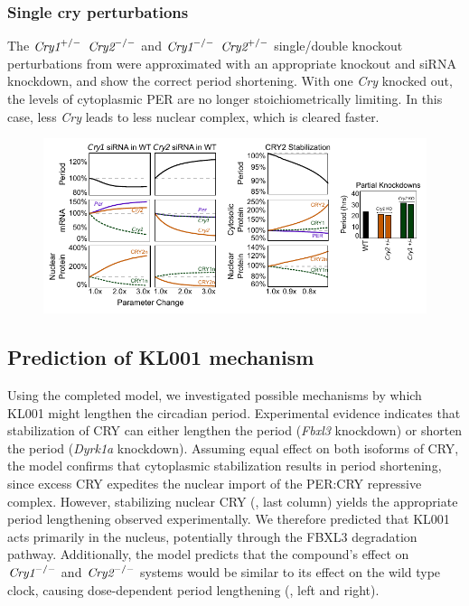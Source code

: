 \subsubsection{Single cry perturbations}
The $\text{\it Cry1}^{+/-}$ $\text{\it Cry2}^{-/-}$ and $\text{\it Cry1}^{-/-}$ $\text{\it Cry2}^{+/-}$ single/double knockout perturbations from \cite{VanderHorst1999} were approximated with an appropriate knockout and siRNA knockdown, and show the correct period shortening. 
With one {\it Cry} knocked out, the levels of cytoplasmic PER are no longer stoichiometrically limiting. 
In this case, less {\it Cry} leads to less nuclear complex, which is cleared faster.

\begin{figure}[bt]
  \centering
  \includegraphics[width=\textwidth]{chap2/figures/experimentalvalidation.pdf}
   \label{fig:experimentalvalidation}
\end{figure}

\subsection{Prediction of KL001 mechanism}
Using the completed model, we investigated possible mechanisms by which KL001 might lengthen the circadian period. 
Experimental evidence indicates that stabilization of CRY can either lengthen the period ({\it Fbxl3} knockdown) or shorten the period ({\it Dyrk1a} knockdown). 
Assuming equal effect on both isoforms of CRY, the model confirms that cytoplasmic stabilization results in period shortening, since excess CRY expedites the nuclear import of the PER:CRY repressive complex. 
However, stabilizing nuclear CRY (, last column) yields the appropriate period lengthening observed experimentally. 
We therefore predicted that KL001 acts primarily in the nucleus, potentially through the FBXL3 degradation pathway. 
Additionally, the model predicts that the compound’s effect on $\text{\it Cry1}^{-/-}$ and $\text{\it Cry2}^{-/-}$ systems would be similar to its effect on the wild type clock, causing dose-dependent period lengthening (, left and right).


